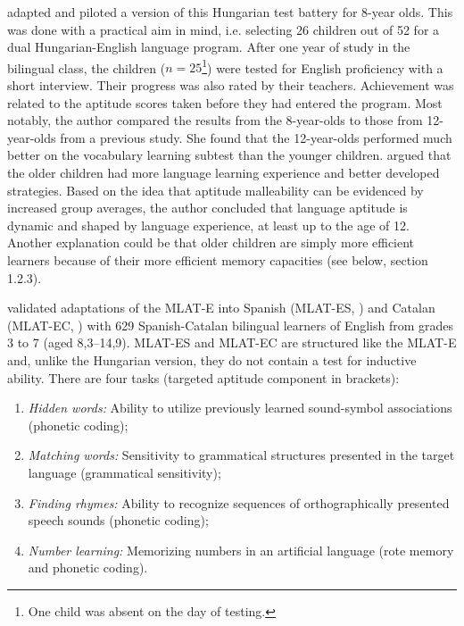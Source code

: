 \documentclass[output=paper]{langscibook}
\begin{document}
\citet{Kiss2009} adapted and piloted a version of this Hungarian test battery for 8-year olds. This was done with a practical aim in mind, i.e. selecting 26 children out of 52 for a dual Hungarian-English language program. After one year of study in the bilingual class, the children ($n=25$\footnote{One child was absent on the day of testing.}) were tested for English proficiency with a short interview. Their progress was also rated by their teachers. Achievement was related to the aptitude scores taken before they had entered the program. Most notably, the author compared the results from the 8-year-olds to those from 12-year-olds from a previous study. She found that the 12-year-olds performed much better on the vocabulary learning subtest than the younger children. \citet{Kiss2009} argued that the older children had more language learning experience and better developed strategies. Based on the idea that aptitude malleability can be evidenced by increased group averages, the author concluded that language aptitude is dynamic and shaped by language experience, at least up to the age of 12. Another explanation could be that older children are simply more efficient learners because of their more efficient memory capacities (see below, section 1.2.3).

\citet{SuarezVilagran2010} validated adaptations of the MLAT-E into Spanish (MLAT-ES, \citealt{StansfieldReed2005}) and Catalan (MLAT-EC, \citealt{SuarezVilagran2010}) with 629 Spanish-Catalan bilingual learners of English from grades 3 to 7 (aged 8,3--14,9). MLAT-ES and MLAT-EC are structured like the MLAT-E and, unlike the Hungarian version, they do not contain a test for inductive ability. There are four tasks (targeted aptitude component in brackets): 

\begin{enumerate}
\item \textit{Hidden words:} Ability to utilize previously learned sound-symbol associations (phonetic coding); 
\item \textit{Matching words:} Sensitivity to grammatical structures presented in the target language (grammatical sensitivity); 
\item \textit{Finding rhymes:} Ability to recognize sequences of orthographically presented speech sounds (phonetic coding); 
\item \textit{Number learning:} Memorizing numbers in an artificial language (rote memory and phonetic coding). 
\end{enumerate}
\end{document}
